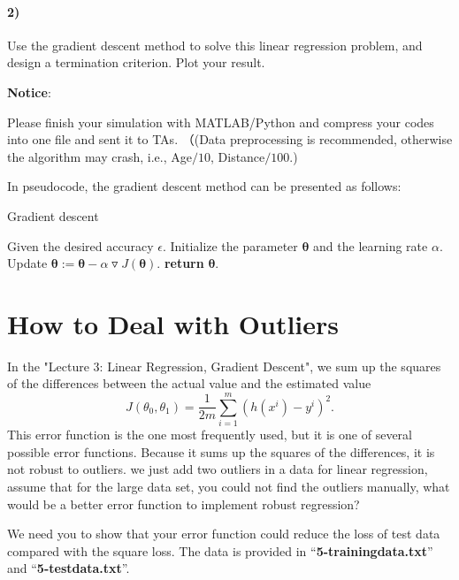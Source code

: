 \documentclass{article}
\begin{document}
\paragraph{2)} Use the gradient descent method to solve this linear regression problem, and design a termination criterion. Plot your result.

\textbf{Notice}:

Please finish your simulation with MATLAB/Python and compress your codes into one file and sent it to TAs. （(Data preprocessing is recommended, otherwise the algorithm may crash, i.e., Age$/10$, Distance$/100$.)


In pseudocode, the gradient descent method can be presented as follows:

\begin{algorithm}
	\caption{Gradient descent}
	\label{a.af}
	\begin{algorithmic}[1]
		\STATE Given the desired accuracy $\epsilon$.
		\STATE  Initialize the parameter $\bm \theta$ and the learning rate $\alpha$.
		\REPEAT
		\STATE Update $\bm \theta:=\bm \theta-\alpha \triangledown J(\bm \theta)$.
		\STATE \textbf{return} $\bm \theta$.
	\end{algorithmic}
\end{algorithm}

\section{How to Deal with Outliers}

In the "Lecture 3: Linear Regression, Gradient Descent", we sum up the squares of the differences between the actual value and the estimated value
\[J(\theta_0,\theta_1)=\frac{1}{2m} \sum_{i=1}^{m}(h(x^i)-y^i)^2.\]
This error function is the one most frequently used, but it is one of several possible error functions. Because it sums up the squares of the differences, it is not robust to outliers. 
we just add two outliers in a data for linear regression, assume that for the large data set, you could not find the outliers manually,  what would be a better error function to implement robust regression? 

We need you to show that your error function could reduce the loss of test data compared with the square loss. The data is provided in ``\textbf{5-trainingdata.txt}'' and ``\textbf{5-testdata.txt}''. 



\end{document}
